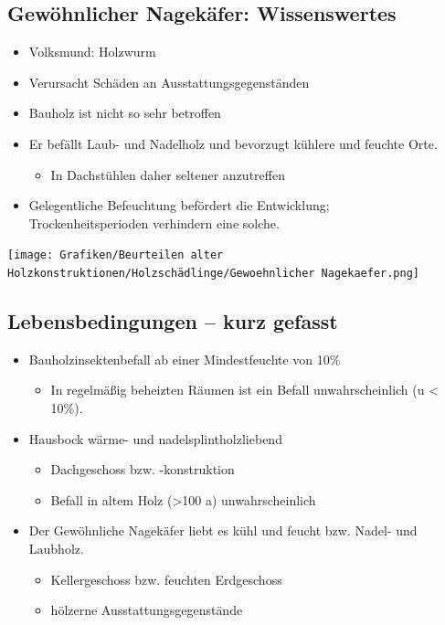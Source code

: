 \documentclass[fleqn,twoside]{article}
\begin{document}
    \subsection{Gewöhnlicher Nagekäfer: Wissenswertes}
    \begin{minipage}{0.75\textwidth}
        \begin{itemize}
            \item Volksmund: Holzwurm
            \item Verursacht Schäden an Ausstattungsgegenständen
            \item Bauholz ist nicht so sehr betroffen
            \item Er befällt Laub- und Nadelholz und bevorzugt kühlere und feuchte Orte.
                \begin{itemize}
                    \item In Dachstühlen daher seltener anzutreffen
                \end{itemize}
            \item Gelegentliche Befeuchtung befördert die Entwicklung; \\ Trockenheitsperioden verhindern eine solche.
        \end{itemize}
    \end{minipage}
    \begin{minipage}{0.25\textwidth}
        \texttt{[image: Grafiken/Beurteilen alter Holzkonstruktionen/Holzschädlinge/Gewoehnlicher Nagekaefer.png]}
    \end{minipage}
        
        
    \subsection{Lebensbedingungen – kurz gefasst}
        \begin{itemize}
            \item Bauholzinsektenbefall ab einer Mindestfeuchte von 10\%
                \begin{itemize}
                    \item In regelmäßig beheizten Räumen ist ein Befall unwahrscheinlich (u < 10\%).
                \end{itemize}
            \item Hausbock wärme- und nadelsplintholzliebend
                \begin{itemize}
                    \item Dachgeschoss bzw. -konstruktion
                    \item Befall in altem Holz (>100 a) unwahrscheinlich
                \end{itemize}
            \item Der Gewöhnliche Nagekäfer liebt es kühl und feucht bzw. Nadel- und Laubholz.
                \begin{itemize}
                    \item Kellergeschoss bzw. feuchten Erdgeschoss
                    \item hölzerne Ausstattungsgegenstände
                \end{itemize}
        \end{itemize}
        
\end{document}
